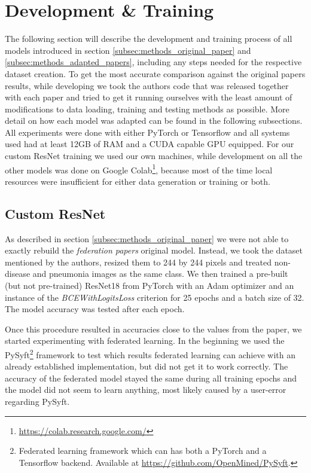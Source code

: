 \section{Development \& Training}\label{sec:dev_and_training}
The following section will describe the development and training process of all models introduced in section \ref{subsec:methods_original_paper} and \ref{subsec:methods_adapted_papers}, including any steps needed for the respective dataset creation. 
To get the most accurate comparison against the original papers results, while developing we took the authors code that was released together with each paper and tried to get it running ourselves with the least amount of modifications to data loading, training and testing methods as possible. More detail on how each model was adapted can be found in the following subsections.
All experiments were done with either PyTorch or Tensorflow and all systems used had at least 12GB of RAM and a CUDA capable GPU equipped. For our custom ResNet training we used our own machines, while development on all the other models was done on Google Colab\footnote{\url{https://colab.research.google.com/}}, because most of the time local resources were insufficient for either data generation or training or both.  


\subsection{Custom ResNet}\label{subsec:methods_resnet}
As described in section \ref{subsec:methods_original_paper} we were not able to exactly rebuild the \textit{federation papers} original model.
Instead, we took the dataset mentioned by the authors, resized them to 244 by 244 pixels and treated non-disease and pneumonia images as the same class. 
We then trained a pre-built (but not pre-trained) ResNet18 from PyTorch with an Adam optimizer and an instance of the \textit{BCEWithLogitsLoss} criterion for 25 epochs and a batch size of 32. The model accuracy was tested after each epoch.

Once this procedure resulted in accuracies close to the values from the paper, we started experimenting with federated learning. In the beginning we used the PySyft\footnote{Federated learning framework which can has both a PyTorch and a Tensorflow backend. Available at \url{https://github.com/OpenMined/PySyft}.} framework to test which results federated learning can achieve with an already established implementation, but did not get it to work correctly. The accuracy of the federated model stayed the same during all training epochs and the model did not seem to learn anything, most likely caused by a user-error regarding PySyft.


